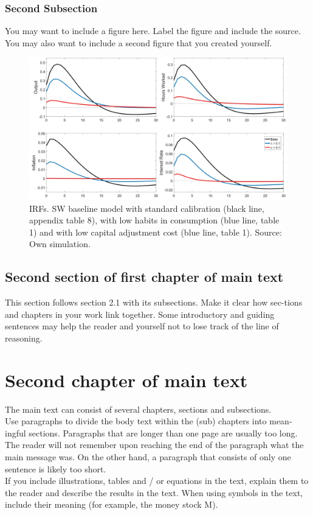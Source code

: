 \documentclass[11pt,a4paper]{article}
\begin{document}
 \subsubsection{Second Subsection}
You may want to include a figure here. Label the figure and include the source. You may also want to include a second figure that you created yourself.
 \begin{figure}[H]
 	\includegraphics[width=\textwidth]{example_figure}
 	\caption[Short description]{IRFs. SW baseline model with standard calibration (black line, appendix table 8), with low habits in consumption (blue line, table 1) and with low capital adjustment cost (blue line, table 1). Source: Own simulation.}
 \end{figure}
\newpage
\subsection{Second section of first chapter of main text}
This section follows section 2.1 with its subsections. Make it clear how sec-tions and chapters in your work link together. Some introductory and guiding sentences may help the reader and yourself not to lose track of the line of reasoning.

\newpage

\section{Second chapter of main text}

The main text can consist of several chapters, sections and subsections.\\
Use paragraphs to divide the body text within the (sub) chapters into mean-ingful sections. Paragraphs that are longer than one page are usually too long. The reader will not remember upon reaching the end of the paragraph what the main message was. On the other hand, a paragraph that consists of only one sentence is likely too short.\\
If you include illustrations, tables and / or equations in the text, explain them to the reader and describe the results in the text. When using symbols in the text, include their meaning (for example, the money stock M).
\end{document}
